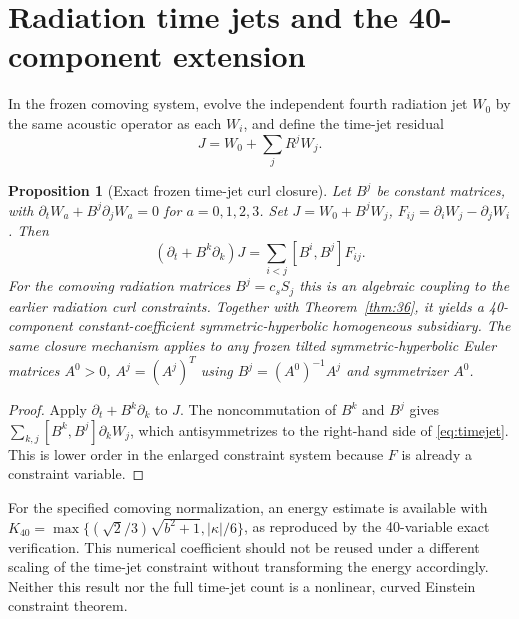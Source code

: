 \documentclass[11pt,a4paper]{article}
\newtheorem{proposition}[theorem]{Proposition}
\newcommand{\kap}{\kappa}
\begin{document}
\section{Radiation time jets and the 40-component extension}
In the frozen comoving system, evolve the independent fourth radiation jet $W_0$ by the same acoustic operator as each $W_i$, and define the time-jet residual
\[J=W_0+\sum_j R^jW_j.\]
\begin{proposition}[Exact frozen time-jet curl closure]\label{prop:40}
Let $B^j$ be \emph{constant} matrices, with $\partial_tW_a+B^j\partial_jW_a=0$ for $a=0,1,2,3$. Set $J=W_0+B^jW_j$, $F_{ij}=\partial_iW_j-\partial_jW_i$. Then
\begin{equation}\label{eq:timejet}
(\partial_t+B^k\partial_k)J
=\sum_{i<j}[B^i,B^j]F_{ij}.
\end{equation}
For the comoving radiation matrices $B^j=c_s S_j$ this is an algebraic coupling to the earlier radiation curl constraints. Together with Theorem~\ref{thm:36}, it yields a 40-component constant-coefficient symmetric-hyperbolic homogeneous subsidiary. The same closure mechanism applies to any frozen tilted symmetric-hyperbolic Euler matrices $A^0>0$, $A^j=(A^j)^T$ using $B^j=(A^0)^{-1}A^j$ and symmetrizer $A^0$.
\end{proposition}
\begin{proof}Apply $\partial_t+B^k\partial_k$ to $J$. The noncommutation of $B^k$ and $B^j$ gives $\sum_{k,j}[B^k,B^j]\partial_kW_j$, which antisymmetrizes to the right-hand side of \eqref{eq:timejet}. This is lower order in the enlarged constraint system because $F$ is already a constraint variable.\end{proof}
For the specified comoving normalization, an energy estimate is available with $K_{40}=\max\{(\sqrt2/3)\sqrt{b^2+1},|\kap|/6\}$, as reproduced by the 40-variable exact verification. This numerical coefficient should not be reused under a different scaling of the time-jet constraint without transforming the energy accordingly. Neither this result nor the full time-jet count is a nonlinear, curved Einstein constraint theorem.
\end{document}
